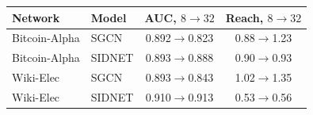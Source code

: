 \begin{tabular}{@{}llcc@{}}
\toprule
Network & Model & AUC, $8\to32$ & Reach, $8\to32$ \\
\midrule
Bitcoin-Alpha & SGCN & 0.892\(\to\)0.823 & 0.88\(\to\)1.23 \\
Bitcoin-Alpha & SIDNET & 0.893\(\to\)0.888 & 0.90\(\to\)0.93 \\
Wiki-Elec & SGCN & 0.893\(\to\)0.843 & 1.02\(\to\)1.35 \\
Wiki-Elec & SIDNET & 0.910\(\to\)0.913 & 0.53\(\to\)0.56 \\
\bottomrule
\end{tabular}
